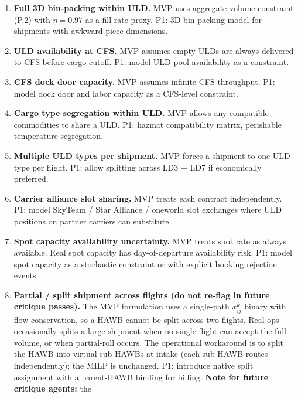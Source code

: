 \documentclass[11pt,a4paper]{article}
\theoremstyle{definition}
\begin{document}
\begin{enumerate}
        dwell distribution (typical: 95--97\% release within hours for pre-filed entries;
        3--5\% held with 1--3 day distribution). Integrates with the probabilistic transit
        time objective above.
  \item \textbf{Full 3D bin-packing within ULD.} MVP uses aggregate volume constraint (P.2)
        with $\eta = 0.97$ as a fill-rate proxy. P1: 3D bin-packing model for shipments
        with awkward piece dimensions.
  \item \textbf{ULD availability at CFS.} MVP assumes empty ULDs are always delivered to CFS
        before cargo cutoff. P1: model ULD pool availability as a constraint.
  \item \textbf{CFS dock door capacity.} MVP assumes infinite CFS throughput. P1: model dock
        door and labor capacity as a CFS-level constraint.
  \item \textbf{Cargo type segregation within ULD.} MVP allows any compatible commodities
        to share a ULD. P1: hazmat compatibility matrix, perishable temperature segregation.
  \item \textbf{Multiple ULD types per shipment.} MVP forces a shipment to one ULD type per
        flight. P1: allow splitting across LD3 + LD7 if economically preferred.
  \item \textbf{Carrier alliance slot sharing.} MVP treats each contract independently.
        P1: model SkyTeam / Star Alliance / oneworld slot exchanges where ULD positions on
        partner carriers can substitute.
  \item \textbf{Spot capacity availability uncertainty.} MVP treats spot rate as always
        available. Real spot capacity has day-of-departure availability risk. P1: model
        spot capacity as a stochastic constraint or with explicit booking rejection events.
  \item \label{item:partial-split-shipment} \textbf{Partial / split shipment across flights
        (do not re-flag in future critique passes).} The MVP formulation uses a single-path
        $x_{ij}^k$ binary with flow conservation, so a HAWB cannot be split across two
        flights. Real ops occasionally splits a large shipment when no single flight can
        accept the full volume, or when partial-roll occurs. The operational workaround
        is to split the HAWB into virtual sub-HAWBs at intake (each sub-HAWB routes
        independently); the MILP is unchanged. P1: introduce native split assignment with
        a parent-HAWB binding for billing. \textbf{Note for future critique agents:} the

\end{enumerate}
\end{document}
